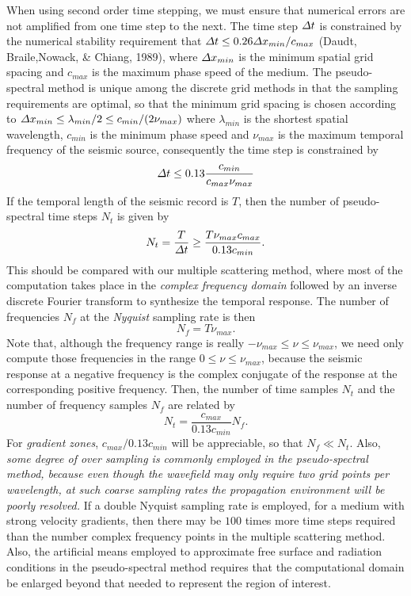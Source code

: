 When using second order time stepping, we must ensure that numerical errors 
are not amplified from one time step to 
the next. The time step ${\mit \Delta }t$ is constrained by the numerical 
stability requirement that 
${\mit \Delta}t \le 0.26 {\mit \Delta }{ x}_{min}/{c}_{max}$  (Daudt, 
Braile,Nowack, \& Chiang, 1989),  where ${\mit \Delta }{ x}_{min}$ is the 
minimum spatial grid spacing and ${c}_{max}$ is the maximum phase speed 
of the medium. The 
pseudo-spectral method is unique among the discrete grid methods in that 
the sampling requirements are optimal, so that 
the minimum grid spacing is chosen according to ${\mit \Delta }{ x}_{min} 
\le \lambda_{min}/2 \le c_{min}/(2 \nu_{max})$ where  $\lambda_{min}$ is 
the shortest spatial  wavelength, $c_{min}$ is the minimum phase speed 
and $\nu_{max}$ is the maximum temporal frequency of the seismic source, 
consequently the time step is constrained by  
\[
{\mit \Delta}t \le 0.13 \frac{{c}_{min}}{{c}_{max} \nu_{max}}
\]
If the temporal length of the seismic record is $T$, then the number of pseudo-spectral time 
steps $N_t$ is given by
\[
N_t=\frac{T}{{\mit \Delta}t}\ge 
 \frac{T \nu_{max} {c}_{max}}{0.13 {c}_{min}}.
\]
This should be compared with our multiple scattering method, where most of 
the computation takes place in the 
{\em complex frequency domain\/} followed by an inverse discrete Fourier 
transform to synthesize 
the temporal response. The number of frequencies $N_f$ at the {\em 
Nyquist\/} sampling rate is then
\[
N_{f}=T \nu_{max}.
\]
Note that, although the frequency range is really $-\nu_{max} \le \nu \le 
\nu_{max}$, we need only compute those frequencies in the range $0 \le \nu \le 
\nu_{max}$, because the seismic response at a negative frequency is 
the complex conjugate of the response at the corresponding positive 
frequency.
Then, the number of time samples $N_{t}$ and the number of frequency 
samples $N_{f}$ are related by
\[
N_{t}=\frac{{c}_{max}}{0.13 {c}_{min}} N_{f}.
\]
For {\em gradient zones\/}, ${{c}_{max}}/{0.13 {c}_{min}}$ will be 
appreciable, so that $N_{f}\ll N_{t}$. Also, {\em some degree of  
over sampling is commonly employed in the pseudo-spectral method, 
because even though the wavefield may only require two grid points per 
wavelength, at such coarse sampling rates the propagation environment 
will be poorly resolved.\/} If a double Nyquist sampling rate is employed, 
for a medium with strong velocity gradients, then there may be $100$ 
times more time steps required than the number complex frequency points 
in the multiple scattering method. Also, the artificial means employed 
to approximate free surface and radiation conditions in the pseudo-spectral 
method requires that the computational domain be enlarged 
beyond that needed to represent the region of interest.


